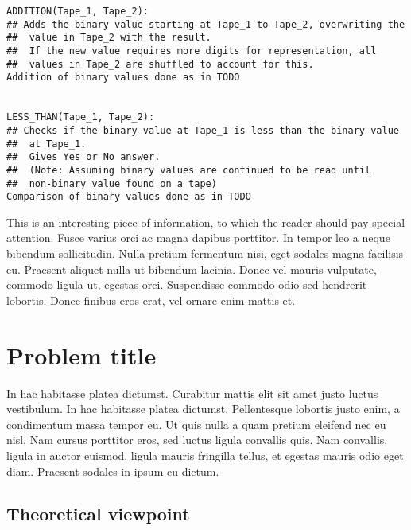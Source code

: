 \documentclass{article}
\begin{document}
\begin{lstlisting}[frame=single]
ADDITION(Tape_1, Tape_2):
## Adds the binary value starting at Tape_1 to Tape_2, overwriting the
##  value in Tape_2 with the result.
##  If the new value requires more digits for representation, all 
##  values in Tape_2 are shuffled to account for this.
Addition of binary values done as in TODO


LESS_THAN(Tape_1, Tape_2):
## Checks if the binary value at Tape_1 is less than the binary value
##  at Tape_1.
##  Gives Yes or No answer.
##  (Note: Assuming binary values are continued to be read until 
##  non-binary value found on a tape)
Comparison of binary values done as in TODO
\end{lstlisting}

\begin{info} %
	This is an interesting piece of information, to which the reader should pay special attention. Fusce varius orci ac magna dapibus porttitor. In tempor leo a neque bibendum sollicitudin. Nulla pretium fermentum nisi, eget sodales magna facilisis eu. Praesent aliquet nulla ut bibendum lacinia. Donec vel mauris vulputate, commodo ligula ut, egestas orci. Suspendisse commodo odio sed hendrerit lobortis. Donec finibus eros erat, vel ornare enim mattis et.
\end{info}


\section{Problem title} %

In hac habitasse platea dictumst. Curabitur mattis elit sit amet justo luctus vestibulum. In hac habitasse platea dictumst. Pellentesque lobortis justo enim, a condimentum massa tempor eu. Ut quis nulla a quam pretium eleifend nec eu nisl. Nam cursus porttitor eros, sed luctus ligula convallis quis. Nam convallis, ligula in auctor euismod, ligula mauris fringilla tellus, et egestas mauris odio eget diam. Praesent sodales in ipsum eu dictum.


\subsection{Theoretical viewpoint}
\end{document}
